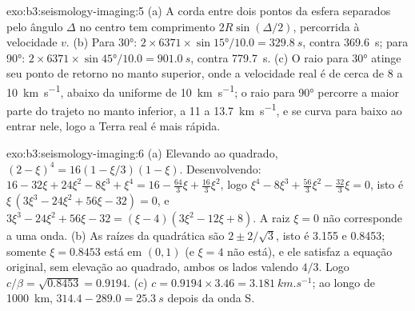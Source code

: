 \begin{solution}{exo:b3:seismology-imaging:5}
(a) A corda entre dois pontos da esfera separados pelo ângulo $\Delta$
no centro tem comprimento $2R\sin(\Delta/2)$, percorrida à velocidade $v$.
(b) Para \ang{30}: $2\times6371\times\sin\ang{15}/10.0 = \qty{329.8}{s}$, contra
\qty{369.6}{s}; para \ang{90}: $2\times6371\times\sin\ang{45}/10.0 =
\qty{901.0}{s}$, contra \qty{779.7}{s}. (c) O raio para \ang{30} atinge seu ponto de retorno no
manto superior, onde a velocidade real é de cerca de 8 a \qty{10}{km.s^{-1}}, abaixo da
uniforme de \qty{10}{km.s^{-1}}; o raio para \ang{90} percorre a maior parte do trajeto no
manto inferior, a 11 a \qty{13.7}{km.s^{-1}}, e se curva para baixo ao entrar nele, logo a
Terra real é mais rápida.
\end{solution}

\begin{solution}{exo:b3:seismology-imaging:6}
(a) Elevando ao quadrado, $(2 - \xi)^4 = 16(1 - \xi/3)(1 - \xi)$. Desenvolvendo:
$16 - 32\xi + 24\xi^2 - 8\xi^3 + \xi^4 = 16 - \tfrac{64}{3}\xi + \tfrac{16}{3}\xi^2$,
logo $\xi^4 - 8\xi^3 + \tfrac{56}{3}\xi^2 - \tfrac{32}{3}\xi = 0$, isto é
$\xi\,(3\xi^3 - 24\xi^2 + 56\xi - 32) = 0$, e
$3\xi^3 - 24\xi^2 + 56\xi - 32 = (\xi - 4)(3\xi^2 - 12\xi + 8)$. A raiz
$\xi = 0$ não corresponde a uma onda. (b) As raízes da quadrática são $2 \pm 2/\sqrt3$,
isto é 3.155 e 0.8453; somente $\xi = 0.8453$ está em $(0, 1)$ (e $\xi = 4$
não está), e ele satisfaz a equação original, sem elevação ao quadrado, ambos os lados valendo $4/3$.
Logo $c/\beta = \sqrt{0.8453} = 0.9194$. (c) $c = 0.9194\times3.46 =
\qty{3.181}{km.s^{-1}}$; ao longo de \qty{1000}{km}, $314.4 - 289.0 = \qty{25.3}{s}$
depois da onda S.
\end{solution}

